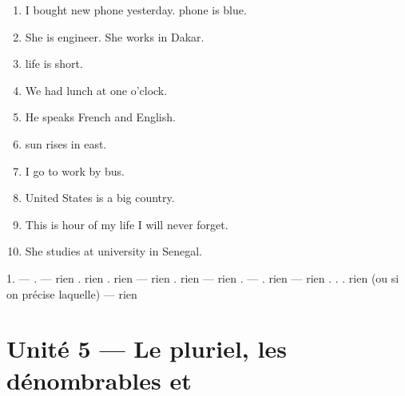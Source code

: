 \begin{exo}
\begin{enumerate}
  \item I bought \trou[1cm] new phone yesterday. \trou[1cm] phone is blue.
  \item She is \trou[1cm] engineer. She works in \trou[1cm] Dakar.
  \item \trou[1cm] life is short.
  \item We had \trou[1cm] lunch at \trou[1cm] one o'clock.
  \item He speaks \trou[1cm] French and \trou[1cm] English.
  \item \trou[1cm] sun rises in \trou[1cm] east.
  \item I go to \trou[1cm] work by \trou[1cm] bus.
  \item \trou[1cm] United States is a big country.
  \item This is \trou[1cm] hour of my life I will never forget.
  \item She studies at \trou[1cm] university in \trou[1cm] Senegal.
\end{enumerate}
\end{exo}
\begin{corrige}[4.1]
1.  ---  .  --- rien . rien . rien --- rien . rien --- rien .  ---  . rien --- rien .  .  . rien (ou  si on précise laquelle) --- rien
\end{corrige}

\section{Unité 5 --- Le pluriel, les dénombrables et }

